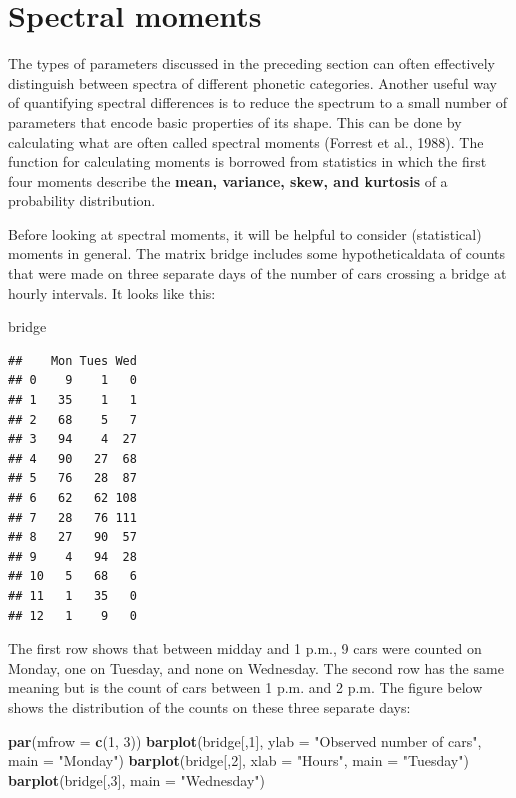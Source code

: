\documentclass[]{book}
\newenvironment{Shaded}{\begin{snugshade}}{\end{snugshade}}
\newcommand{\DataTypeTok}[1]{\textcolor[rgb]{0.13,0.29,0.53}{#1}}
\newcommand{\DecValTok}[1]{\textcolor[rgb]{0.00,0.00,0.81}{#1}}
\newcommand{\KeywordTok}[1]{\textcolor[rgb]{0.13,0.29,0.53}{\textbf{#1}}}
\newcommand{\NormalTok}[1]{#1}
\newcommand{\StringTok}[1]{\textcolor[rgb]{0.31,0.60,0.02}{#1}}
\begin{document}
\hypertarget{spectral-moments}{%
\section{Spectral moments}\label{spectral-moments}}

The types of parameters discussed in the preceding section can often effectively distinguish between spectra of different phonetic categories. Another useful way of quantifying spectral differences is to reduce the spectrum to a small number of parameters that encode basic properties of its shape. This can be done by calculating what are often called spectral moments (Forrest et al., 1988). The function for calculating moments is borrowed from statistics in which the first four moments describe the \textbf{mean, variance, skew, and kurtosis} of a probability distribution.

Before looking at spectral moments, it will be helpful to consider
(statistical) moments in general. The matrix bridge includes some hypotheticaldata of counts that were made on three separate days of the number of cars crossing a bridge at hourly intervals. It looks like this:

\begin{Shaded}
\begin{Highlighting}[]
\NormalTok{bridge}
\end{Highlighting}
\end{Shaded}

\begin{verbatim}
##    Mon Tues Wed
## 0    9    1   0
## 1   35    1   1
## 2   68    5   7
## 3   94    4  27
## 4   90   27  68
## 5   76   28  87
## 6   62   62 108
## 7   28   76 111
## 8   27   90  57
## 9    4   94  28
## 10   5   68   6
## 11   1   35   0
## 12   1    9   0
\end{verbatim}

The first row shows that between midday and 1 p.m., 9 cars were counted on
Monday, one on Tuesday, and none on Wednesday. The second row has the same
meaning but is the count of cars between 1 p.m. and 2 p.m. The figure below shows the distribution of the counts on these three separate days:

\begin{Shaded}
\begin{Highlighting}[]
\KeywordTok{par}\NormalTok{(}\DataTypeTok{mfrow =} \KeywordTok{c}\NormalTok{(}\DecValTok{1}\NormalTok{, }\DecValTok{3}\NormalTok{)) }
\KeywordTok{barplot}\NormalTok{(bridge[,}\DecValTok{1}\NormalTok{], }
        \DataTypeTok{ylab =} \StringTok{"Observed number of cars"}\NormalTok{, }
        \DataTypeTok{main =} \StringTok{"Monday"}\NormalTok{) }
\KeywordTok{barplot}\NormalTok{(bridge[,}\DecValTok{2}\NormalTok{], }
        \DataTypeTok{xlab =} \StringTok{"Hours"}\NormalTok{,}
        \DataTypeTok{main =} \StringTok{"Tuesday"}\NormalTok{) }
\KeywordTok{barplot}\NormalTok{(bridge[,}\DecValTok{3}\NormalTok{], }
        \DataTypeTok{main =} \StringTok{"Wednesday"}\NormalTok{) }
\end{Highlighting}
\end{Shaded}
\end{document}
